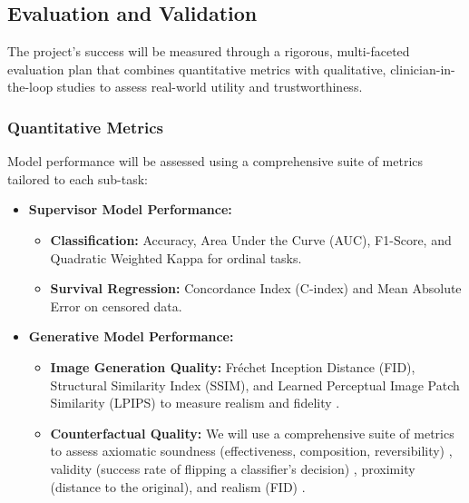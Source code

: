 \documentclass[11pt, a4paper]{article}
\begin{document}
\subsection{Evaluation and Validation}
The project's success will be measured through a rigorous, multi-faceted evaluation plan that combines quantitative metrics with qualitative, clinician-in-the-loop studies to assess real-world utility and trustworthiness.

\subsubsection{Quantitative Metrics}
Model performance will be assessed using a comprehensive suite of metrics tailored to each sub-task:
\begin{itemize}
    \item \textbf{Supervisor Model Performance:}
        \begin{itemize}
            \item \textbf{Classification:} Accuracy, Area Under the Curve (AUC), F1-Score, and Quadratic Weighted Kappa for ordinal tasks.
            \item \textbf{Survival Regression:} Concordance Index (C-index) and Mean Absolute Error on censored data.
        \end{itemize}
    \item \textbf{Generative Model Performance:}
        \begin{itemize}
            \item \textbf{Image Generation Quality:} Fréchet Inception Distance (FID), Structural Similarity Index (SSIM), and Learned Perceptual Image Patch Similarity (LPIPS) to measure realism and fidelity \cite{VigneshwaranOhara2024, Singla2022}.
            \item \textbf{Counterfactual Quality:} We will use a comprehensive suite of metrics to assess axiomatic soundness (effectiveness, composition, reversibility) \cite{KomanduriWu2023, MonteiroRibeiro2023}, validity (success rate of flipping a classifier’s decision) \cite{SinglaEslami2021, Singla2022}, proximity (distance to the original), and realism (FID) \cite{GuoDeng2024}.
        \end{itemize}
\end{itemize}
\end{document}
